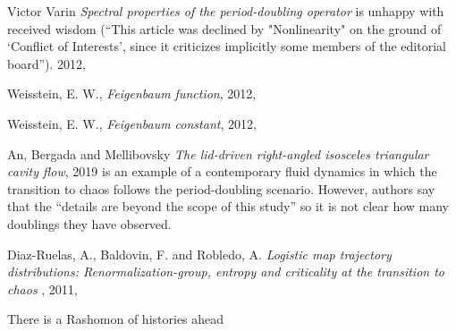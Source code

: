 \begin{description}
Victor Varin {\em Spectral properties of the period-doubling operator}
 is unhappy with received wisdom (``This article was
declined by "Nonlinearity" on the ground of `Conflict of Interests',
since it criticizes implicitly some members of the editorial board'').
{2012},

{Weisstein, E. W.},
{\em Feigenbaum function},
{2012},

{Weisstein, E. W.},
{\em Feigenbaum constant},
{2012},

{An, Bergada and Mellibovsky}
{\em The lid-driven right-angled isosceles triangular cavity flow},
{2019}
is an example of a contemporary fluid dynamics in which the transition to
chaos follows the period-doubling scenario. However, authors say that the
``details are beyond the scope of this study'' so it is not clear how
many doublings they have observed.

{Diaz-Ruelas, A., Baldovin, F. and Robledo, A.}
{\em Logistic map trajectory distributions: Renormalization-group,
entropy and criticality at the transition to chaos}
,
{2011},


\end{description}


There is a Rashomon of histories ahead

